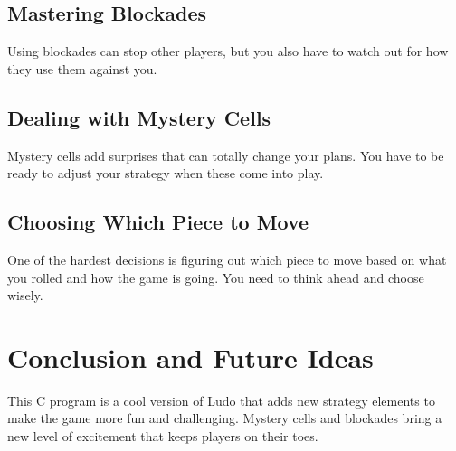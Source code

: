 \documentclass[12pt]{article}
\begin{document}
\subsection{Mastering Blockades}
Using blockades can stop other players, but you also have to watch out for how they use them against you.

\subsection{Dealing with Mystery Cells}
Mystery cells add surprises that can totally change your plans. You have to be ready to adjust your strategy when these come into play.

\subsection{Choosing Which Piece to Move}
One of the hardest decisions is figuring out which piece to move based on what you rolled and how the game is going. You need to think ahead and choose wisely.

\section{Conclusion and Future Ideas}
This C program is a cool version of Ludo that adds new strategy elements to make the game more fun and challenging. Mystery cells and blockades bring a new level of excitement that keeps players on their toes.
\end{document}

